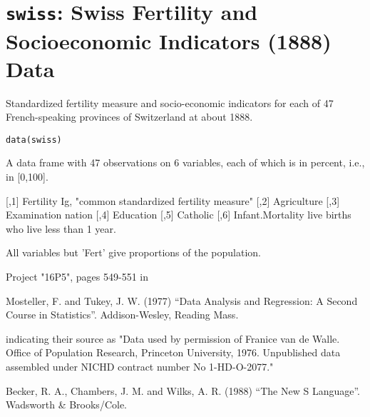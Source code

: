  \section{{\tt swiss}: Swiss Fertility and Socioeconomic Indicators (1888) Data}\label{ss:swiss}
\begin{Description}\relax
Standardized fertility measure and socio-economic indicators for
each of 47 French-speaking provinces of Switzerland at about 1888.
\end{Description}
\begin{Usage}
\begin{verbatim}data(swiss)\end{verbatim}
\end{Usage}
\begin{Format}\relax
A data frame with 47 observations on 6 variables, each of which
is in percent, i.e., in [0,100].

[,1]  Fertility         Ig, "common standardized fertility measure"
[,2]  Agriculture       
[,3]  Examination       
nation
[,4]  Education         
[,5]  Catholic          
[,6]  Infant.Mortality  live births who live less than 1 year.

All variables but 'Fert' give proportions of the population.
\end{Format}
\begin{Source}\relax
Project "16P5", pages 549-551 in

Mosteller, F. and Tukey, J. W. (1977) ``Data Analysis and
Regression: A Second Course in Statistics''. Addison-Wesley,
Reading Mass.

indicating their source as "Data used by permission of Franice van
de Walle. Office of Population Research, Princeton University,
1976.  Unpublished data assembled under NICHD contract number No
1-HD-O-2077."
\end{Source}
\begin{References}\relax
Becker, R. A., Chambers, J. M. and Wilks, A. R. (1988) ``The New S
Language''. Wadsworth \& Brooks/Cole.
\end{References}


